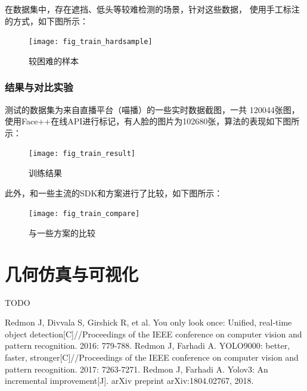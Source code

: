 \documentclass[a4paper, notitlepage]{article}
\begin{document}
在数据集中，存在遮挡、低头等较难检测的场景，针对这些数据，
使用手工标注的方式，如下图所示：

\begin{figure}[H]
    \centering
    \texttt{[image: fig\_train\_hardsample]}
    \caption{较困难的样本}
    \label{fig:example}
\end{figure}

\subsubsection{结果与对比实验}
测试的数据集为来自直播平台（喵播）的一些实时数据截图，一共
120044张图，使用Face++在线API进行标记，有人脸的图片为102680张，算法的表现如下图所示：
\begin{figure}[H]
    \centering
    \texttt{[image: fig\_train\_result]}
    \caption{训练结果}
    \label{fig:example}
\end{figure}

此外，和一些主流的SDK和方案进行了比较，如下图所示：

\begin{figure}[H]
    \centering
    \texttt{[image: fig\_train\_compare]}
    \caption{与一些方案的比较}
    \label{fig:example}
\end{figure}

\section{几何仿真与可视化}
TODO

\begin{thebibliography}{X}
Redmon J, Divvala S, Girshick R, et al. You only look once: Unified, real-time object detection[C]//Proceedings of the IEEE conference on computer vision and pattern recognition. 2016: 779-788.
Redmon J, Farhadi A. YOLO9000: better, faster, stronger[C]//Proceedings of the IEEE conference on computer vision and pattern recognition. 2017: 7263-7271. 
Redmon J, Farhadi A. Yolov3: An incremental improvement[J]. arXiv preprint arXiv:1804.02767, 2018.
\end{thebibliography}

\clearpage


\end{document}
